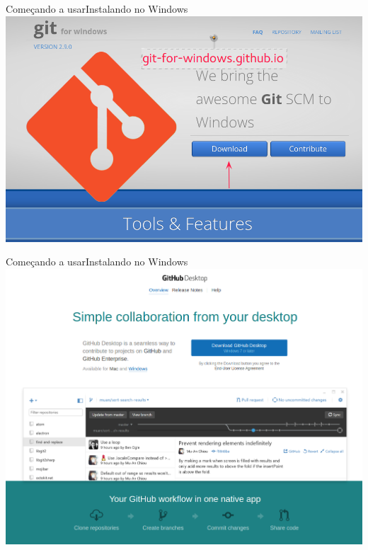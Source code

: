 \documentclass[10pt]{beamer}
\begin{document}
\begin{frame}{Começando a usar}{Instalando no Windows}
  \includegraphics[scale=0.37]{AAUgraphics/download1}
\end{frame}
\begin{frame}{Começando a usar}{Instalando no Windows}
  \includegraphics[scale=0.32]{AAUgraphics/download2}
\end{frame}
\end{document}
